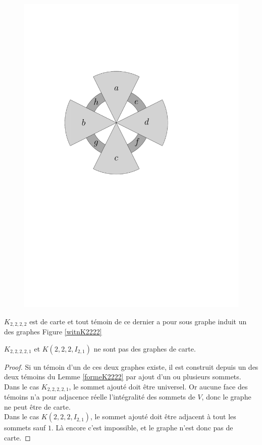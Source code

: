 \documentclass{scrartcl}
\begin{document}
\begin{flushleft}
\begin{figure}[h]
\begin{center}
        \includegraphics[page=\ipeFigsecondtemoinquatriparti, scale = 0.5]{figs}
    \end{center}
\end{figure}

\begin{lem}\label{formeK2222}
    $K_{2,2,2,2}$ est de carte et tout témoin de ce dernier a pour sous graphe induit un des graphes Figure \ref{witnK2222}
\end{lem}

\begin{prop}\label{K22221}
    $K_{2,2,2,2,1}$ et $K(2,2,2,I_{2,1})$ ne sont pas des graphes de carte.
\end{prop}

\begin{proof}
    Si un témoin d'un de ces deux graphes existe, il est construit depuis un des deux témoins du Lemme \ref{formeK2222} par ajout
    d'un ou plusieurs sommets.\\
    Dans le cas $K_{2,2,2,2,1}$, le sommet ajouté doit être universel. Or aucune face des témoins n'a pour adjacence réelle
    l'intégralité des sommets de $V$, donc le graphe ne peut être de carte.\\
    Dans le cas $K(2,2,2,I_{2,1})$, le sommet ajouté doit être adjacent à tout les sommets sauf $1$. Là encore c'est impossible, et le
    graphe n'est donc pas de carte.
\end{proof}



\end{flushleft}
\end{document}
